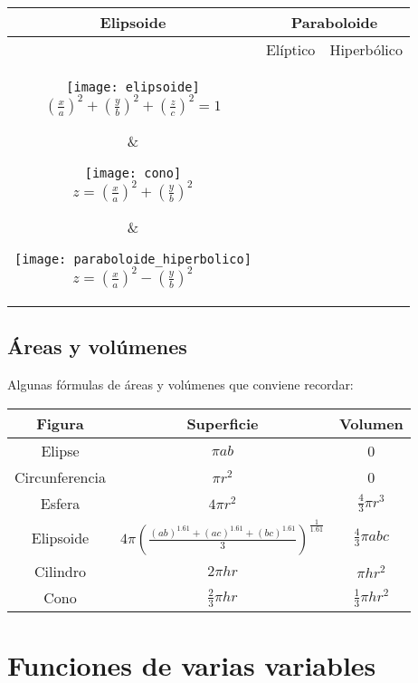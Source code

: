 \documentclass[a4paper, twoside]{article}
\numberwithin{equation}{section}
\numberwithin{figure}{section}
\numberwithin{table}{section}
\begin{document}
\begin{center}
	\begin{tabular}{c | c c}
		\textbf{Elipsoide} & \multicolumn{2}{c}{\textbf{Paraboloide}} \\
		\hline
		 & Elíptico & Hiperbólico \\
		\parbox{5cm}{
			\begin{center}
				\texttt{[image: elipsoide]} \\
				$\left(\frac{x}{a}\right)^2+\left(\frac{y}{b}\right)^2+\left(\frac{z}{c}\right)^2=1$
			\end{center}} &
		\parbox{5cm}{
			\begin{center}
				\texttt{[image: cono]} \\
				$z=\left(\frac{x}{a}\right)^2+\left(\frac{y}{b}\right)^2$
			\end{center}} &
		\parbox{5cm}{
			\begin{center}
				\texttt{[image: paraboloide\_hiperbolico]} \\
				$z=\left(\frac{x}{a}\right)^2-\left(\frac{y}{b}\right)^2$
			\end{center}} \\
	\end{tabular}
\end{center}

\subsection{Áreas y volúmenes}
Algunas fórmulas de áreas y volúmenes que conviene recordar:

\begin{center}
	\begin{tabular}{c c c}
		Figura & Superficie & Volumen \\
		\hline
		Elipse & $\pi ab$ & 0 \\
		Circunferencia & $\pi r^2$ & 0 \\
		Esfera & $4\pi r^2$ & $\frac{4}{3}\pi r^3$ \\
		Elipsoide & $4\pi \left(\frac{(ab)^{1.61}+(ac)^{1.61}+(bc)^{1.61}}{3}\right)^\frac{1}{1.61}$ 
		& $\frac{4}{3}\pi abc$ \\
		Cilindro & $2\pi h r$ & $\pi h r^2$ \\
		Cono & $\frac{2}{3}\pi h r$ & $\frac{1}{3}\pi h r^2$ \\
	\end{tabular}
\end{center}

\newpage
\section{Funciones de varias variables}
\end{document}
